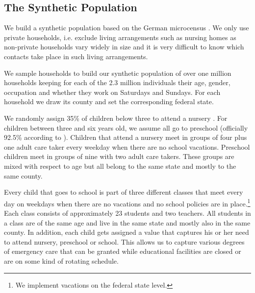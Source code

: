 \subsection{The Synthetic Population}
\label{subsec:synthetic_population}

We build a synthetic population based on the German microcensus \citep{FDSAeDBUDL2018}.
We only use private households, i.e. exclude living arrangements such as nursing homes as
non-private households vary widely in size and it is very difficult to know which
contacts take place in such living arrangements.

We sample households to build our synthetic population of over one million households
keeping for each of the 2.3 million individuals their age, gender, occupation and whether
they work on Saturdays and Sundays. For each household we draw its county and set the
corresponding federal state.%

We randomly assign 35\% of children below three to attend a nursery \citep{Destatis2020}.
For children between three and six years old, we assume all go to preschool (officially
92.5\% according to \cite{Destatis2020}).
Children that attend a nursery meet in groups of four \citep{BertelsmannStiftung2019}
plus one adult care taker every weekday when there are no school vacations. Preschool
children meet in groups of nine \citep{BertelsmannStiftung2019} with two adult care
takers. These groups are mixed with respect to age but all belong to the same state and
mostly to the same county.

Every child that goes to school is part of three different classes that meet every day on
weekdays when there are no vacations and no school policies are in place.\footnote{We
implement vacations on the federal state level.} Each class consists of approximately 23
students \citep{OECD2013} and two teachers. All students in a class are of the same age
and live in the same state and mostly also in the same county. In addition, each
child gets assigned a value that captures his or her need to attend nursery, preschool or
school. This allows us to capture various degrees of emergency care that can be granted
while educational facilities are closed or are on some kind of rotating schedule.

